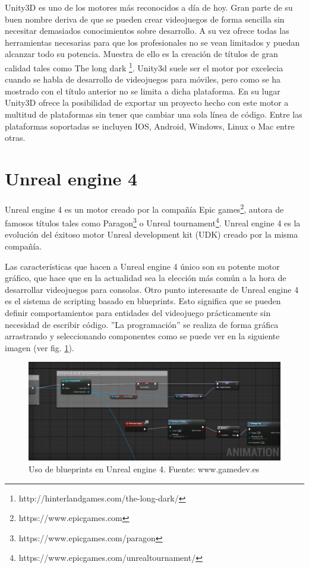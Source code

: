 Unity3D es uno de los motores más reconocidos a día de hoy. Gran parte de su buen nombre deriva de que se pueden crear videojuegos de forma sencilla sin necesitar demasiados conocimientos sobre desarrollo. A su vez ofrece todas las herramientas necesarias para que los profesionales no se vean limitados y puedan alcanzar todo su potencia. Muestra de ello es la creación de títulos de gran calidad tales como The long dark \footnote{http://hinterlandgames.com/the-long-dark/}. Unity3d suele ser el motor por excelecia cuando se habla de desarrollo de videojuegos para móviles, pero como se ha mostrado con el título anterior no se limita a dicha plataforma. En su lugar Unity3D ofrece la posibilidad de exportar un proyecto hecho con este motor a multitud de plataformas sin tener que cambiar una sola línea de código. Entre las plataformas soportadas se incluyen IOS, Android, Windows, Linux o Mac entre otras.

\section{Unreal engine 4}

Unreal engine 4 es un motor creado por la compañía Epic games\footnote{https://www.epicgames.com}, autora de famosos títulos tales como Paragon\footnote{https://www.epicgames.com/paragon} o Unreal tournament\footnote{https://www.epicgames.com/unrealtournament/}. 
Unreal engine 4 es la evolución del éxitoso motor Unreal development kit (UDK) creado por la misma compañía.


Las características que hacen a Unreal engine 4 único son su potente motor gráfico, que hace que en la actualidad sea la elección más común a la hora de desarrollar videojuegos para consolas. Otro punto interesante de Unreal engine 4 es el sistema de scripting basado en blueprints. Esto significa que se pueden definir comportamientos para entidades del videojuego prácticamente sin necesidad de escribir código. ''La programación'' se realiza de forma gráfica arrastrando y seleccionando componentes como se puede ver en la siguiente imagen (ver fig. \ref{blueprints}).

\begin{figure}
\begin{center}
\includegraphics[scale=0.4]{imagenes/blueprints.png}
\caption{Uso de blueprints en Unreal engine 4. Fuente: www.gamedev.es}
\label{blueprints}
\end{center}
\end{figure}

